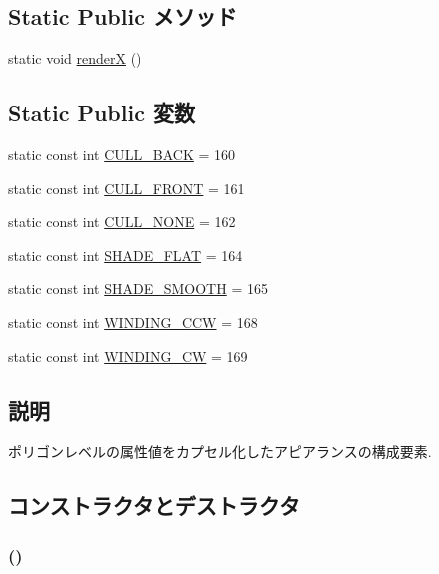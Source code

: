 \subsection*{Static Public メソッド}
\begin{CompactItemize}
\item 
static void \hyperlink{classm3g_1_1PolygonMode_443a7a301f77f625335ecc06d13bad06}{renderX} ()
\end{CompactItemize}
\subsection*{Static Public 変数}
\begin{CompactItemize}
\item 
static const int \hyperlink{classm3g_1_1PolygonMode_34ae9162b765ddbc1d2476edf3195361}{CULL\_\-BACK} = 160
\item 
static const int \hyperlink{classm3g_1_1PolygonMode_efa180528b010979c6f7732c3c3114ae}{CULL\_\-FRONT} = 161
\item 
static const int \hyperlink{classm3g_1_1PolygonMode_48717ad405f481d0f2ab8e948bf86822}{CULL\_\-NONE} = 162
\item 
static const int \hyperlink{classm3g_1_1PolygonMode_5da32249eba3f6eb4366f016c424099e}{SHADE\_\-FLAT} = 164
\item 
static const int \hyperlink{classm3g_1_1PolygonMode_2da5e6696c8e910d9fca74b583a081df}{SHADE\_\-SMOOTH} = 165
\item 
static const int \hyperlink{classm3g_1_1PolygonMode_98d881cf813edf483860268535014210}{WINDING\_\-CCW} = 168
\item 
static const int \hyperlink{classm3g_1_1PolygonMode_86975b3dec0d6cc20f54fd82eb13ef9e}{WINDING\_\-CW} = 169
\end{CompactItemize}


\subsection{説明}
ポリゴンレベルの属性値をカプセル化したアピアランスの構成要素. 

\subsection{コンストラクタとデストラクタ}
\hypertarget{classm3g_1_1PolygonMode_b089ee808cbc4799bb2e92dd4ca554c3}{
\subsubsection[{PolygonMode}]{ ()}}
\label{classm3g_1_1PolygonMode_b089ee808cbc4799bb2e92dd4ca554c3}


